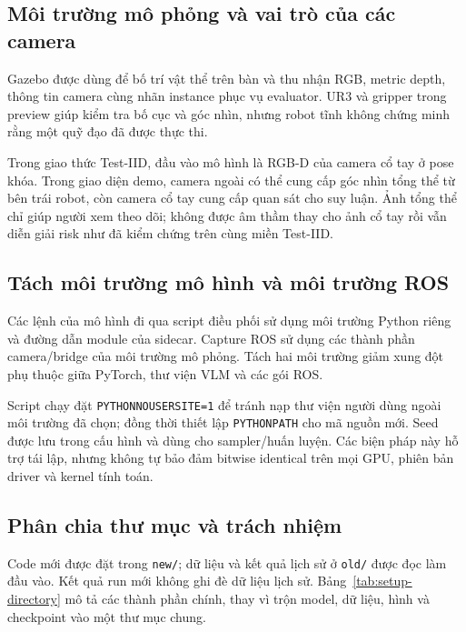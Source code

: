 \subsection{Môi trường mô phỏng và vai trò của các camera}

Gazebo được dùng để bố trí vật thể trên bàn và thu nhận RGB,
metric depth, thông tin camera cùng nhãn instance phục vụ evaluator.
UR3 và gripper trong preview giúp kiểm tra bố cục và góc nhìn,
nhưng robot tĩnh không chứng minh rằng một quỹ đạo đã được thực thi.

Trong giao thức Test-IID, đầu vào mô hình là RGB-D của camera cổ tay
ở pose khóa. Trong giao diện demo, camera ngoài có thể cung cấp góc
nhìn tổng thể từ bên trái robot, còn camera cổ tay cung cấp quan sát
cho suy luận. Ảnh tổng thể chỉ giúp người xem theo dõi; không được
âm thầm thay cho ảnh cổ tay rồi vẫn diễn giải risk như đã kiểm
chứng trên cùng miền Test-IID.

\subsection{Tách môi trường mô hình và môi trường ROS}

Các lệnh của mô hình đi qua script điều phối sử dụng môi trường
Python riêng và đường dẫn module của sidecar. Capture ROS sử
dụng các thành phần camera/bridge của môi trường mô phỏng.
Tách hai môi trường giảm xung đột phụ thuộc giữa PyTorch, thư
viện VLM và các gói ROS.

Script chạy đặt \texttt{PYTHONNOUSERSITE=1} để tránh nạp thư viện
người dùng ngoài môi trường đã chọn; đồng thời thiết lập
\texttt{PYTHONPATH} cho mã nguồn mới.
Seed được lưu trong cấu hình và dùng cho sampler/huấn luyện.
Các biện pháp này hỗ trợ tái lập, nhưng không tự bảo đảm bitwise
identical trên mọi GPU, phiên bản driver và kernel tính toán.

\subsection{Phân chia thư mục và trách nhiệm}

Code mới được đặt trong \texttt{new/}; dữ liệu và kết quả lịch sử
ở \texttt{old/} được đọc làm đầu vào. Kết quả run mới không ghi
đè dữ liệu lịch sử. Bảng~\ref{tab:setup-directory} mô tả các thành
phần chính, thay vì trộn model, dữ liệu, hình và checkpoint vào
một thư mục chung.

